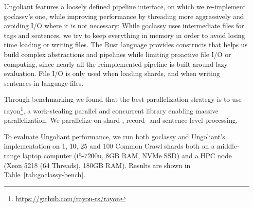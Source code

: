 Ungoliant features a loosely defined pipeline interface, on which we re-implement goclassy's one, while improving performance by threading more aggressively and avoiding I/O where it is not necessary: While goclassy uses intermediate files for tags and sentences, we try to keep everything in memory in order to avoid losing time loading or writing files. The Rust language provides constructs that helps us build complex abstractions and pipelines while limiting proactive file I/O or computing, since nearly all the reimplemented pipeline is built around lazy evaluation. File I/O is only used when loading shards, and when writing sentences in language files.

Through benchmarking we found that the best parallelization strategy is to use rayon\footnote{\url{https://github.com/rayon-rs/rayon}}, a work-stealing \cite{blumofe-etal-1999-scheduling} parallel and concurrent library enabling massive parallelization. We parallelize on \mbox{shard-,} record- and sentence-level processing.

To evaluate Ungoliant performance, we run both goclassy and Ungoliant's implementation on 1, 10, 25 and 100 Common Crawl shards both on a middle-range laptop computer (i5-7200u, 8GB RAM, NVMe SSD) and a HPC node (Xeon 5218 (64 Threads), 180GB RAM). Results are shown in Table~\ref{tab:goclassy-bench}.

\begin{table}[t]
    \centering\small
    \caption{Comparison of approximate generation times depending on platform and number of shards.}
    \label{tab:goclassy-bench}
\end{table}

